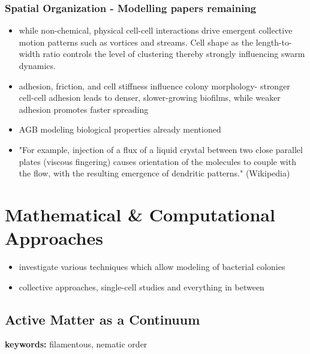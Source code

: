 \subsubsection{Spatial Organization - Modelling papers remaining}
\begin{itemize}
    \item \cite{Starru2007} while non-chemical, physical cell-cell interactions drive
        emergent collective motion patterns such as vortices and streams. Cell shape as
        the length-to-width ratio controls the level of clustering thereby strongly
        influencing swarm dynamics. 
    \item \cite{Jin2020,Jin2020_2} adhesion, friction, and cell stiffness influence
        colony morphology- stronger cell-cell adhesion leads to denser, slower-growing
        biofilms, while weaker adhesion promotes faster spreading
    \item \cite{Li2025} AGB modeling \cite{vanGestel2015} biological properties already mentioned
    \item \cite{Buka1987} "For example, injection of a flux of a liquid crystal between
        two close parallel plates (viscous fingering) causes orientation of the molecules
        to couple with the flow, with the resulting emergence of dendritic patterns."
        (Wikipedia) 
\end{itemize}

\section{Mathematical \& Computational Approaches}

\begin{itemize}
    \item investigate various techniques which allow modeling of bacterial colonies
    \item collective approaches, single-cell studies and everything in between
\end{itemize}

\subsection{Active Matter as a Continuum}

\textbf{keywords:}
filamentous, nematic order

